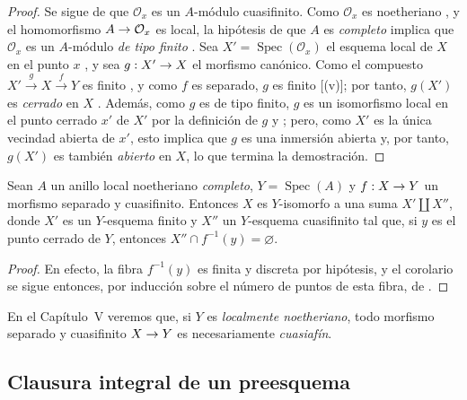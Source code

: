 \documentclass[oneside,10pt]{amsart}
\makeatletter
\newcommand{\ega@arrow}[2]{\mathchoice{#1}{#2}{#2}{#2}}
\renewcommand{\to}{\ega@arrow{\longrightarrow}{\rightarrow}}
\let\EGAOriginalLabel\label
\renewcommand{\label}[1]{\phantomsection\EGAOriginalLabel{#1}}
\makeatother
\begin{document}
\begin{proof}
Se sigue de  que $\mathcal{O}_x$ es un $A$-módulo cuasifinito.
Como $\mathcal{O}_x$ es noetheriano , y el homomorfismo $A\to\mathcal{O}_x$ es local, la hipótesis de que $A$ es \emph{completo} implica que $\mathcal{O}_x$ es un $A$-módulo \emph{de tipo finito} .
Sea $X'=\operatorname{Spec}(\mathcal{O}_x)$ el esquema local de $X$ en el punto $x$ , y sea $g:X'\to X$ el morfismo canónico.
Como el compuesto $X'\xrightarrow{g}X\xrightarrow{f}Y$ es finito , y como $f$ es separado, $g$ es finito [(v)]; por tanto, $g(X')$ es \emph{cerrado} en $X$ .
Además, como $g$ es de tipo finito, $g$ es un isomorfismo local en el punto cerrado $x'$ de $X'$ por la definición de $g$ y ;
pero, como $X'$ es la única vecindad abierta de $x'$, esto implica que $g$ es una inmersión abierta y, por tanto, $g(X')$ es también \emph{abierto} en $X$, lo que termina la demostración.
\end{proof}

\begin{corollary}[6.2.6]
\label{II.6.2.6-fr}
Sean $A$ un anillo local noetheriano \emph{completo}, $Y=\operatorname{Spec}(A)$ y $f:X\to Y$ un morfismo separado y cuasifinito.
Entonces $X$ es $Y$-isomorfo a una suma $X'\amalg X''$, donde $X'$ es un $Y$-esquema finito y $X''$ un $Y$-esquema cuasifinito tal que, si $y$ es el punto cerrado de $Y$, entonces $X''\cap f^{-1}(y)=\varnothing$.
\end{corollary}

\begin{proof}
En efecto, la fibra $f^{-1}(y)$ es finita y discreta por hipótesis, y el corolario se sigue entonces, por inducción sobre el número de puntos de esta fibra, de .
\end{proof}

\begin{remark}[6.2.7]
\label{II.6.2.7-fr}
En el Capítulo~V veremos que, si $Y$ es \emph{localmente noetheriano}, todo morfismo separado y cuasifinito $X\to Y$ es necesariamente \emph{cuasiafín}.
\end{remark}

\subsection{Clausura integral de un preesquema}
\label{subsection:II.6.3-fr}
\end{document}
